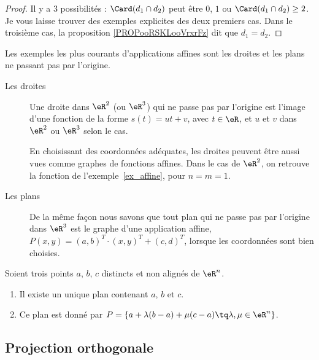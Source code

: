 \begin{proof}
	Il y a \( 3\) possibilités : \( \Card(d_1\cap d_2)\) peut être \( 0\), \( 1\) ou \( \Card(d_1\cap d_2)\geq 2\). Je vous laisse trouver des exemples explicites des deux premiers cas. Dans le troisième cas, la proposition \ref{PROPooRSKLooVrxrFz} dit que \( d_1=d_2\).
\end{proof}

\begin{example}
	Les exemples les plus courants d'applications affines sont les droites et les plans ne passant pas par l'origine.
	\begin{description}
		\item[Les droites] Une droite dans \( \eR^2\) (ou \( \eR^3\)) qui ne passe pas par l'origine est l'image d'une fonction de la forme \( s(t) =u t +v\), avec \( t \in \eR\), et \( u\) et \( v\) dans \( \eR^2\) ou \( \eR^3\) selon le cas.

			En choisissant des coordonnées adéquates, les droites peuvent être aussi vues comme graphes de fonctions affines. Dans le cas de \( \eR^2\), on retrouve la fonction de l'exemple~\ref{ex_affine}, pour \( n = m = 1 \).

		\item[Les plans]
			De la même façon nous savons que tout plan qui ne passe pas par l'origine dans \( \eR^3\) est le graphe d'une application affine, \( P(x,y)= (a,b)^T\cdot(x,y)^T+(c,d)^T\), lorsque les coordonnées sont bien choisies.
	\end{description}
\end{example}


\begin{proposition}	\label{PROPooTVSZooOJTnnn}
	Soient trois points \( a\), \( b\), \( c\) distincts et non alignés de \( \eR^n\).
	\begin{enumerate}
		\item
		      Il existe un unique plan contenant \( a\), \( b\) et \( c\).
		\item
		      Ce plan est donné par \( P=\{ a+\lambda(b-a)+\mu(c-a)\tq \lambda,\mu\in \eR^n \}\).
	\end{enumerate}
\end{proposition}


\subsection{Projection orthogonale}

